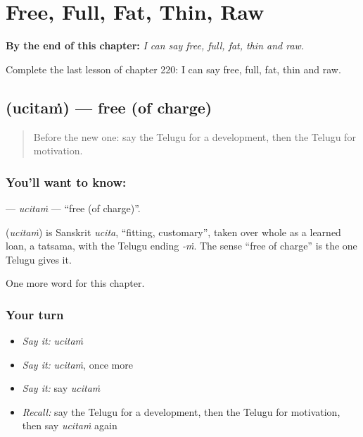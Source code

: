 
\chapter{Free, Full, Fat, Thin, Raw}
\label{ch:te-free-full-fat-thin-raw}

\begin{chapteropening}
\textbf{By the end of this chapter:} \emph{I can say free, full, fat, thin and raw.}

Complete the last lesson of chapter 220: I can say free, full, fat, thin and raw.
\end{chapteropening}

\section[\texorpdfstring{\te{ఉచితం} (ucitaṁ)}{ఉచితం (ucitaṁ)}]{ (ucitaṁ) — free (of charge)}

\label{lesson:TE-C220-ucitam}



\begin{quote}
Before the new one: say the Telugu for a development, then the Telugu for motivation.
\end{quote}

\subsection*{You'll want to know: }
\textbf{} — \emph{ucitaṁ} — \textquotedblleft{}free (of charge)\textquotedblright{}.

\begin{cousinweb}
\textbf{} (\emph{ucitaṁ}) is Sanskrit \emph{ucita}, \textquotedblleft{}fitting, customary\textquotedblright{}, taken over whole as a learned loan, a tatsama, with the Telugu ending \emph{-ṁ}. The sense \textquotedblleft{}free of charge\textquotedblright{} is the one Telugu gives it.
\end{cousinweb}

\begin{grammarlens}[title={What you've built}]
One more word for this chapter.
\end{grammarlens}

\subsection*{Your turn}
\begin{itemize}
\raggedright
  \item \emph{Say it:} \emph{ucitaṁ}
  \item \emph{Say it:} \emph{ucitaṁ}, once more
  \item \emph{Say it:} say \emph{ucitaṁ}
  \item \emph{Recall:} say the Telugu for a development, then the Telugu for motivation, then say \emph{ucitaṁ} again
\end{itemize}

